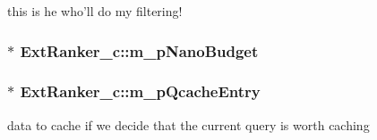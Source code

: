 this is he who'll do my filtering! 

\hypertarget{classExtRanker__c_a6e94067c0956f1699ba0d72d60bd83e2}{
\subsubsection[{m\-\_\-p\-Nano\-Budget}]{$\ast$ Ext\-Ranker\-\_\-c\-::m\-\_\-p\-Nano\-Budget\hspace{0.3cm}{\ttfamily [protected]}}}\label{classExtRanker__c_a6e94067c0956f1699ba0d72d60bd83e2}
\hypertarget{classExtRanker__c_a888956042764154d8c4660c424da374b}{
\subsubsection[{m\-\_\-p\-Qcache\-Entry}]{$\ast$ Ext\-Ranker\-\_\-c\-::m\-\_\-p\-Qcache\-Entry\hspace{0.3cm}{\ttfamily [protected]}}}\label{classExtRanker__c_a888956042764154d8c4660c424da374b}


data to cache if we decide that the current query is worth caching 

